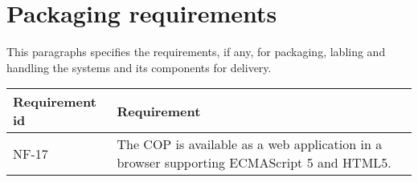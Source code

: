 
\newpage
\section{Packaging requirements}
This paragraphs specifies the requirements, if any, for packaging, labling and handling the systems and its components for delivery.

\begin{longtable}{| p{3.2cm} |  p{10cm} | }
	\hline
	\textbf{Requirement id} &  \textbf{Requirement } \\
	\hline
	NF-17 & The COP is available as a web application in a browser supporting ECMAScript 5 and HTML5. \\
	\hline
\end{longtable}